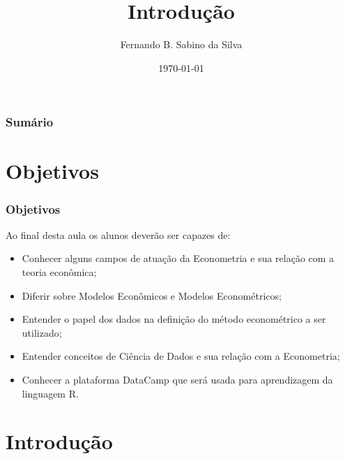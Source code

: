 \documentclass[pdf,9pt,xcolor=dvipsnames,hide notes]{beamer}\usepackage[]{graphicx}\usepackage[]{color}
\title[UFRGS]{Introdução}
\author[Estatística Geral II]{Fernando B. Sabino da Silva}
\date{\today}
\begin{document}


\begin{frame}
   \titlepage
\end{frame}

\begin{frame}[plain]\frametitle{Sumário}
\tableofcontents
\end{frame}


\section{Objetivos}

\begin{frame}\frametitle{Objetivos}
Ao final desta aula os alunos deverão ser capazes de:
  \begin{itemize}
    \item Conhecer alguns campos de atuação da Econometria e sua relação com a teoria econômica;
    \item Diferir sobre Modelos Econômicos e Modelos Econométricos;
    \item Entender o papel dos dados na definição do método econométrico a ser utilizado;
    \item Entender conceitos de Ciência de Dados e sua relação com a Econometria;
    \item Conhecer a plataforma DataCamp que será usada para aprendizagem da linguagem R.
  \end{itemize}
\end{frame}


\section{Introdução}
\end{document}
